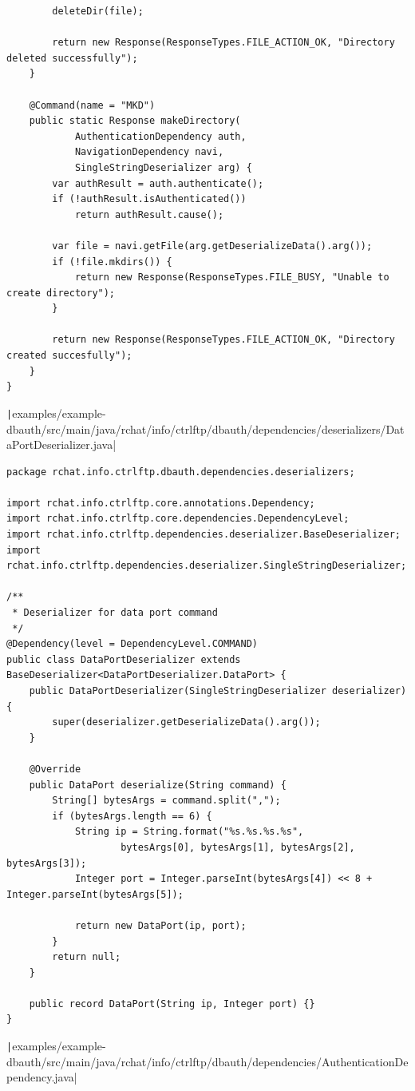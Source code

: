 \documentclass[a4paper,14pt]{extarticle}
\begin{document}
\begin{verbatim}
        deleteDir(file);

        return new Response(ResponseTypes.FILE_ACTION_OK, "Directory deleted successfully");
    }

    @Command(name = "MKD")
    public static Response makeDirectory(
            AuthenticationDependency auth,
            NavigationDependency navi,
            SingleStringDeserializer arg) {
        var authResult = auth.authenticate();
        if (!authResult.isAuthenticated())
            return authResult.cause();

        var file = navi.getFile(arg.getDeserializeData().arg());
        if (!file.mkdirs()) {
            return new Response(ResponseTypes.FILE_BUSY, "Unable to create directory");
        }

        return new Response(ResponseTypes.FILE_ACTION_OK, "Directory created succesfully");
    }
}
\end{verbatim}
\texttt|examples/example-dbauth/src/main/java/rchat/info/ctrlftp/dbauth/dependencies/deserializers/DataPortDeserializer.java|
\begin{verbatim}
package rchat.info.ctrlftp.dbauth.dependencies.deserializers;

import rchat.info.ctrlftp.core.annotations.Dependency;
import rchat.info.ctrlftp.core.dependencies.DependencyLevel;
import rchat.info.ctrlftp.dependencies.deserializer.BaseDeserializer;
import rchat.info.ctrlftp.dependencies.deserializer.SingleStringDeserializer;

/**
 * Deserializer for data port command
 */
@Dependency(level = DependencyLevel.COMMAND)
public class DataPortDeserializer extends BaseDeserializer<DataPortDeserializer.DataPort> {
    public DataPortDeserializer(SingleStringDeserializer deserializer) {
        super(deserializer.getDeserializeData().arg());
    }

    @Override
    public DataPort deserialize(String command) {
        String[] bytesArgs = command.split(",");
        if (bytesArgs.length == 6) {
            String ip = String.format("%s.%s.%s.%s",
                    bytesArgs[0], bytesArgs[1], bytesArgs[2], bytesArgs[3]);
            Integer port = Integer.parseInt(bytesArgs[4]) << 8 + Integer.parseInt(bytesArgs[5]);

            return new DataPort(ip, port);
        }
        return null;
    }

    public record DataPort(String ip, Integer port) {}
}
\end{verbatim}
\texttt|examples/example-dbauth/src/main/java/rchat/info/ctrlftp/dbauth/dependencies/AuthenticationDependency.java|
\end{document}
